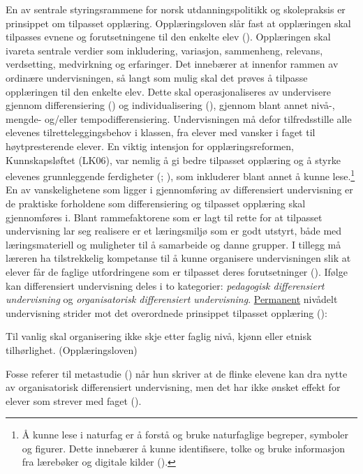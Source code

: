 \documentclass[main.tex]{subfiles}
\begin{document}
En av sentrale styringsrammene for norsk utdanningspolitikk og skolepraksis er prinsippet om tilpasset opplæring. Opplæringsloven slår fast at opplæringen skal tilpasses evnene og forutsetningene til den enkelte elev (). Opplæringen skal ivareta sentrale verdier som inkludering, variasjon, sammenheng, relevans, verdsetting, medvirkning og erfaringer. Det innebærer at innenfor rammen av ordinære undervisningen, så langt som mulig skal det prøves å tilpasse opplæringen til den enkelte elev. Dette skal operasjonaliseres av undervisere gjennom differensiering () og individualisering (), gjennom blant annet nivå-, mengde- og/eller tempodifferensiering. Undervisningen må defor tilfredsstille alle elevenes tilretteleggingsbehov i klassen, fra elever med vansker i faget til høytpresterende elever. En viktig intensjon for opplæringsreformen, Kunnskapsløftet (LK06), var nemlig å gi bedre tilpasset opplæring og å styrke elevenes grunnleggende ferdigheter (; ), som inkluderer blant annet å kunne lese.\footnote{Å kunne lese i naturfag er å forstå og bruke naturfaglige begreper, symboler og figurer. Dette innebærer å kunne identifisere, tolke og bruke informasjon fra lærebøker og digitale kilder ().}
\newline\newline
En av vanskelighetene som ligger i gjennomføring av differensiert undervisning er de praktiske forholdene som differensiering og tilpasset opplæring skal gjennomføres i. Blant rammefaktorene som er lagt til rette for at tilpasset undervisning lar seg realisere er et læringsmiljø som er godt utstyrt, både med læringsmateriell og muligheter til å samarbeide og danne grupper. I tillegg må læreren ha tilstrekkelig kompetanse til å kunne organisere undervisningen  slik at elever får de faglige utfordringene som er tilpasset deres forutsetninger ().
\newline\newline
Ifølge  kan differensiert undervisning deles i to kategorier: \emph{pedagogisk differensiert undervisning} og \emph{organisatorisk differensiert undervisning}. \underline{Permanent} nivådelt undervisning strider mot det overordnede prinsippet tilpasset opplæring ():
\begin{displayquote}
\textelp{} Til vanlig skal organisering ikke skje etter faglig nivå, kjønn eller etnisk tilhørlighet. (Opplæringsloven)
\end{displayquote}
Fosse referer til metastudie () når hun skriver at de flinke elevene kan dra nytte av organisatorisk differensiert undervisning, men det har ikke ønsket effekt for elever som strever med faget (). 
\end{document}
